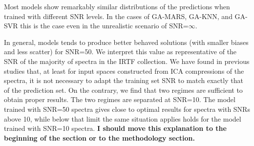 Most models show remarkably similar distributions of the
predictions when trained with different SNR levels. In the cases of
GA-MARS, GA-KNN, and GA-SVR this is the case even in the unrealistic
scenario of SNR=$\infty$.

In general, models tends to produce better behaved solutions (with
smaller biases and less scatter) for SNR=50. We interpret this value
as representative of the SNR of the majority of spectra in the IRTF
collection. We have found in previous studies that, at least for input
spaces constructed from ICA compressions of the spectra, it is not
necessary to adapt the training set SNR to match exactly that of the
prediction set. On the contrary, we find that two regimes are
sufficient to obtain proper results. The two regimes are separated at
SNR=10. The model trained with SNR=50 spectra gives close to optimal
results for spectra with SNRs above 10, while below that limit the
same situation applies holds for the model trained with SNR=10
spectra. {\bf I should move this explanation to the beginning of the
section or to the methodology section.}






